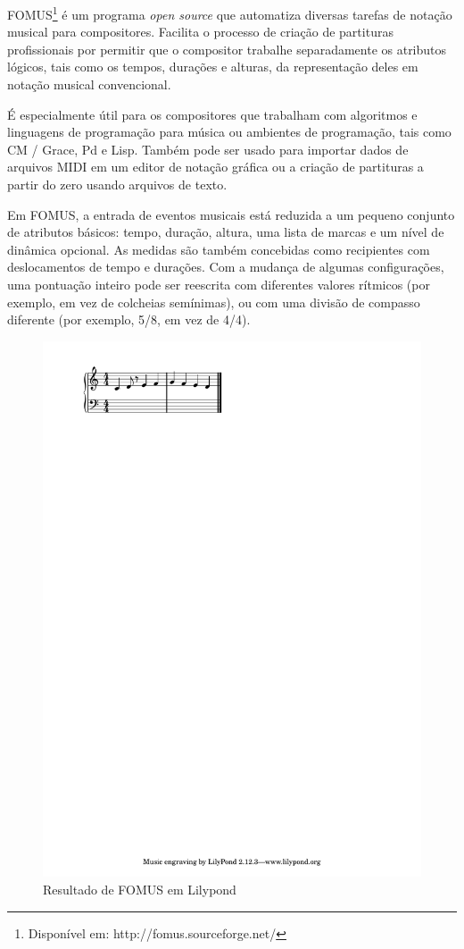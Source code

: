 \documentclass{ppgmus}
\begin{document}

FOMUS\footnote{Disponível em: http://fomus.sourceforge.net/} é um programa \textit{open source} que automatiza diversas tarefas de notação musical para compositores. 
Facilita o processo de criação de partituras profissionais por permitir que o compositor trabalhe separadamente os atributos 
lógicos, tais como os tempos, durações e alturas, da representação deles em notação musical convencional. 

É especialmente útil para os compositores que trabalham com algoritmos e linguagens de programação para música ou 
ambientes de programação, tais como CM / Grace, Pd e Lisp. Também pode ser usado para importar dados de arquivos MIDI em um editor 
de notação gráfica ou a criação de partituras a partir do zero usando arquivos de texto.

Em FOMUS, a entrada de eventos musicais está reduzida a um pequeno conjunto de atributos básicos: tempo, 
duração, altura, uma lista de marcas e um nível de dinâmica opcional. As medidas são também concebidas como 
recipientes com deslocamentos de tempo e durações. Com a mudança de algumas configurações, uma pontuação inteiro pode 
ser reescrita com diferentes valores rítmicos (por exemplo, em vez de colcheias semínimas), ou com uma divisão de compasso 
diferente (por exemplo, 5/8, em vez de 4/4). 

\begin{figure}
\includegraphics[scale= 1]{fomus}
\caption{Resultado de FOMUS em Lilypond}
\label{fomus}
\end{figure} 
\end{document}
